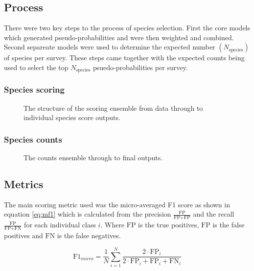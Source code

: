 \subsection{Process}

\newcommand{\nspecies}{N_{\text{species}}}

There were two key steps to the process of species selection. First the core models which generated pseudo-probabilities and were then weighted and combined. 
Second separeate models were used to determine the expected number $(\nspecies)$ of species per survey. 
These steps came together with the expected counts being used to select the top  $\nspecies$ psuedo-probabilities per survey.

\subsubsection{Species scoring}
\begin{figure}
    \begin{center}
        
        \caption{The structure of the scoring ensemble from data through to individual species score outputs.}
    \end{center}\label{fig:score-structure}
\end{figure}
\subsubsection{Species counts}
\begin{figure}
    \begin{center}
        
        \caption{The counts ensemble through to final outputs.}
    \end{center}\label{fig:count-structure}
\end{figure}
\subsection{Metrics}

\newcommand{\fp}{\text{FP}}
\newcommand{\fn}{\text{FN}}
\newcommand{\tp}{\text{FP}}

The main scoring metric used was the micro-averaged F1 score as shown in equation \ref{eq:mf1} which is calculated from the precision $\frac{\tp}{\tp + \fp}$ and the recall $\frac{\tp}{\tp + \fn}$ for each individual class $i$. 
Where $\tp$ is the true positives, $\fp$ is the false positives and $\fn$ is the false negatives.

\begin{equation}\label{eq:mf1}
    \text{F1}_{micro} = \frac{1}{N}\sum_{i=1}^N\frac{2 \cdot \tp_i}{2 \cdot \tp_i + \fp_i + \fn_i}
\end{equation}
